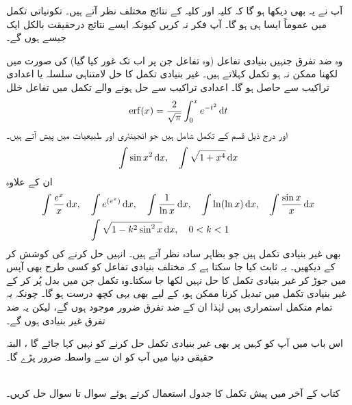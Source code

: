 آپ نے یہ بھی دیکھا ہو گا کہ کلیہ  اور کلیہ  کے نتائج مختلف نظر آتے ہیں۔ تکونیاتی تکمل میں عموماً ایسا ہی ہو گا۔ آپ فکر نہ کریں کیونکہ  ایسے نتائج درحقیقت بالکل  ایک جیسے  ہوں گے۔

وہ ضد تفرق جنہیں بنیادی تفاعل (وہ تفاعل جن پر اب تک غور کیا گیا) کی صورت میں لکھنا ممکن نہ ہو  تکمل کہلاتے ہیں۔ غیر بنیادی تکمل کا حل لامتناہی سلسلہ  یا اعدادی تراکیب سے حاصل ہو گا۔ اعدادی تراکیب سے حل ہونے والے تکمل میں تفاعل خلل
\begin{align*}
\erf(x)=\frac{2}{\sqrt{\pi}}\int_0^x e^{-t^2}\dif t
\end{align*}
اور درج ذیل قسم کے تکمل شامل ہیں جو انجینئری اور طبیعیات میں پیش آتے  ہیں۔
\begin{align*}
\int\sin x^2\dif x,\quad \int \sqrt{1+x^4}\dif x
\end{align*}
ان کے علاوہ
\begin{align*}
\int\frac{e^x}{x}\dif x,\quad &\int e^{(e^x)}\dif x,\quad \int\frac{1}{\ln x}\dif x,\quad \int \ln(\ln x)\dif x,\quad \int\frac{\sin x}{x}\dif x\\
&\int \sqrt{1-k^2\sin^2x}\dif x,\quad 0<k<1
\end{align*}
بھی غیر بنیادی تکمل ہیں  جو بظاہر سادہ نظر آتے ہیں۔ انہیں حل کرنے کی کوشش کر کے دیکھیں۔ یہ ثابت کیا جا سکتا ہے کہ مختلف بنیادی تفاعل کو کسی طرح بھی آپس میں جوڑ کر غیر بنیادی تکمل کا حل نہیں لکھا جا سکتا۔وہ تکمل  جن میں بدل پُر کر کے غیر بنیادی تکمل میں تبدیل کرنا ممکن ہو،  کے لیے بھی یہی کچھ درست ہو گا۔ چونکہ یہ تمام متکمل استمراری ہیں لہٰذا ان کے ضد تفرق ضرور  موجود ہوں گے، لیکن یہ ضد تفرق غیر بنیادی ہوں گے۔ 

اس باب میں آپ کو کہیں پر بھی غیر بنیادی تکمل حل کرنے کو نہیں کہا جائے گا ، البتہ حقیقی دنیا میں آپ کو ان سے واسطہ ضرور پڑے گا۔


\\
کتاب کے آخر میں پیش   تکمل  کا جدول استعمال کرتے ہوئے سوال  تا سوال  حل کریں۔

